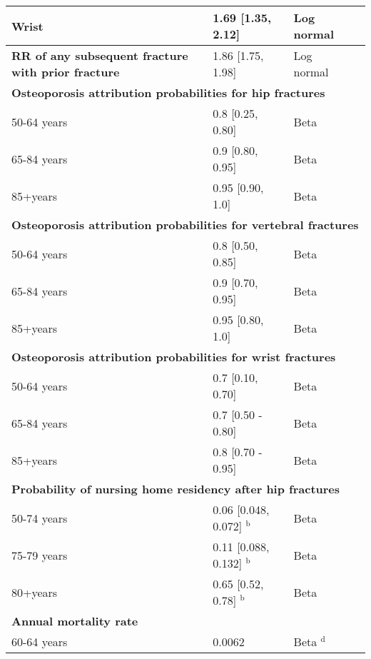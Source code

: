 \begin{center}
{\begin{longtable}{m{5.3cm}lll}
Wrist & 1.69 [1.35, 2.12] & Log normal & \cite{4-51}\\
\midrule
{\bf RR of any subsequent fracture with prior fracture} & 1.86 [1.75, 1.98] & Log normal & \cite{4-49}\\
\midrule
\multicolumn{4}{l}{{\bf Osteoporosis attribution probabilities for hip fractures}}\\
\midrule
50-64 years & 0.8 [0.25, 0.80] & Beta & \cite{4-48}\\
65-84 years & 0.9 [0.80, 0.95] & Beta & \cite{4-48}\\
85+years & 0.95 [0.90, 1.0] & Beta & \cite{4-48}\\
\midrule
\multicolumn{4}{l}{{\bf Osteoporosis attribution probabilities for vertebral fractures}}\\
\midrule
50-64 years & 0.8 [0.50, 0.85] & Beta & \cite{4-48}\\
65-84 years & 0.9 [0.70, 0.95] & Beta & \cite{4-48}\\
85+years & 0.95 [0.80, 1.0] & Beta & \cite{4-48}\\
\midrule
\multicolumn{4}{l}{{\bf Osteoporosis attribution probabilities for wrist fractures}}\\
\midrule
50-64 years & 0.7 [0.10, 0.70] & Beta & \cite{4-48}\\
65-84 years & 0.7 [0.50 - 0.80] & Beta & \cite{4-48}\\
85+years & 0.8 [0.70 - 0.95] & Beta & \cite{4-48}\\
\midrule
\multicolumn{4}{l}{{\bf Probability of nursing home residency after hip fractures}}\\
\midrule
50-74 years & 0.06 [0.048, 0.072] $^{\mathrm{b}}$ & Beta & \cite{4-68}\\
75-79 years & 0.11 [0.088, 0.132] $^{\mathrm{b}}$ & Beta & \cite{4-68}\\
80+years & 0.65 [0.52, 0.78] $^{\mathrm{b}}$ & Beta & \cite{4-69}\\
\midrule
\multicolumn{4}{l}{{\bf Annual mortality rate}}\\
\midrule
60-64 years & 0.0062 & Beta $^{\mathrm{d}}$ & \cite{4-53}\\

\end{longtable}}
\end{center}
